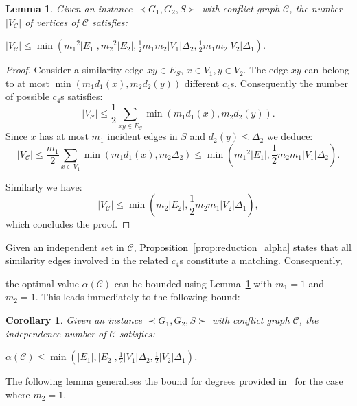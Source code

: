 \documentclass[final]{dmtcs-episciences}
\newtheorem{lemma}[theorem]{Lemma}
\newtheorem{corollary}[theorem]{Corollary}
\newcommand\mar[1]{\textcolor{black}{#1}}
\begin{document}
\begin{lemma}
\label{vertexlemma}
Given an instance $\prec G_1,G_2,S \succ$ with conflict graph $\mathcal{C}$, the number $|V_\mathcal{C}|$ of vertices of $\mathcal{C}$ satisfies:\\ 
{\centerline{$|V_\mathcal{C}|\leq \min \left({m_1}^2|E_1|,{m_2}^2|E_2|, \frac{1}{2}m_1m_2|V_1|\Delta_2,\frac{1}{2}m_1m_2|V_2|\Delta_1\right)$.}}
\end{lemma}
\begin{proof}
Consider a similarity edge $xy\in E_S$, $x\in V_1, y\in V_2$.  
The edge $xy$ can belong to at most $\min(m_1d_1(x), m_2d_2(y))$ different $c_4$s. Consequently the number of possible  $c_4$s satisfies: 
$$|V_\mathcal{C}|\leq\frac{1}{2}\sum_{xy\in E_S}\min(m_1d_1(x), m_2d_2(y)).$$
Since $x$ has at most $m_1$ incident edges in $S$ and $d_2(y)\leq \Delta_2$ we deduce:  
$$|V_\mathcal{C}|\leq \frac{m_1}{2}\sum_{x\in V_1}\min(m_1d_1(x), m_2\Delta_2)\leq \min({m_1}^2|E_1|, \frac{1}{2}m_2m_1 |V_1|\Delta_2).$$ 

Similarly we have:
$$|V_\mathcal{C}|\leq \min(m_2|E_2|, \frac{1}{2}m_2m_1 |V_2|\Delta_1),$$ 
which concludes the proof.
\end{proof}


Given an independent set in $\mathcal{C}$, \mar{Proposition~\ref{prop:reduction_alpha} states that} all similarity edges involved in the related $c_4$s constitute a matching. Consequently, 

the optimal value $\alpha(\mathcal{C})$ can be bounded using Lemma~\ref{vertexlemma} with $m_1=1$ and $m_2=1$. This leads immediately to the following bound:


\begin{corollary}\label{cor:alpha}
Given an instance $\prec G_1,G_2,S \succ$ with conflict graph $\mathcal{C}$, the independence number of $\mathcal{C}$  satisfies:\\ 
{\centerline{$\alpha(\mathcal{C})\leq \min \left(|E_1|,|E_2|, \frac{1}{2}|V_1|\Delta_2,\frac{1}{2}|V_2|\Delta_1\right)$.}}
\end{corollary}

The following lemma generalises the 
bound for degrees provided in~\citet{Fertin200990} for the case where $m_2=1$.
\end{document}
